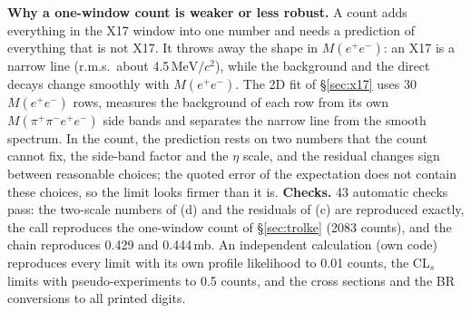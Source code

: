 \documentclass[11pt,a4paper]{article}
\newcommand{\Mfour}{\ensuremath{M(\pi^{+}\pi^{-}e^{+}e^{-})}\xspace}
\newcommand{\Mee}{\ensuremath{M(e^{+}e^{-})}\xspace}
\newcommand{\MeVcc}{\ensuremath{\mathrm{MeV}/c^{2}}\xspace}
\newcommand{\code}[1]{\texttt{\detokenize{#1}}}
\begin{document}
\textbf{Why a one-window count is weaker or less robust.} A count adds everything in the X17 window into one number and needs a prediction of
everything that is not X17. It throws away the shape in \Mee: an X17 is a narrow line (r.m.s.\ about 4.5\,\MeVcc), while the background and
the direct decays change smoothly with \Mee. The 2D fit of \S\ref{sec:x17} uses 30 \Mee rows, measures the background of each row from its
own \Mfour side bands and separates the narrow line from the smooth spectrum. In the count, the prediction rests on two numbers that the
count cannot fix, the side-band factor and the $\eta$ scale, and the residual changes sign between reasonable choices; the quoted error of
the expectation does not contain these choices, so the limit looks firmer than it is.
\textbf{Checks.} 43 automatic checks pass: the two-scale numbers of (d) and the residuals of (c) are reproduced exactly, the \code{TRolke}
call reproduces the one-window count of \S\ref{sec:trolke} (2083 counts), and the chain reproduces 0.429 and 0.444\,mb. An independent
calculation (own code) reproduces every \code{TRolke} limit with its own profile likelihood to 0.01 counts, the CL$_s$ limits with
pseudo-experiments to 0.5 counts, and the cross sections and the BR conversions to all printed digits.
\end{document}
